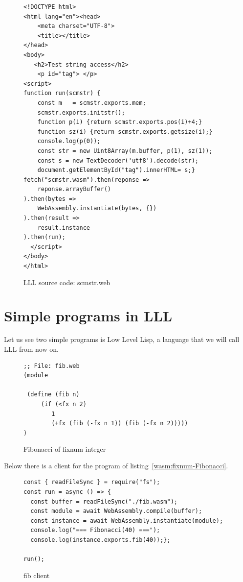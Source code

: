 \documentclass[a4paper,12pt]{book}
\begin{document}
\begin{figure}[!h]
\begin{verbatim}
<!DOCTYPE html>
<html lang="en"><head>
    <meta charset="UTF-8">
    <title></title>
</head>
<body>
   <h2>Test string access</h2>
    <p id="tag"> </p>
<script>
function run(scmstr) {
    const m   = scmstr.exports.mem;
    scmstr.exports.initstr();
    function p(i) {return scmstr.exports.pos(i)+4;}
    function sz(i) {return scmstr.exports.getsize(i);}
    console.log(p(0));
    const str = new Uint8Array(m.buffer, p(1), sz(1));
    const s = new TextDecoder('utf8').decode(str);
    document.getElementById("tag").innerHTML= s;}
fetch("scmstr.wasm").then(reponse =>
    reponse.arrayBuffer()
).then(bytes =>
    WebAssembly.instantiate(bytes, {})
).then(result =>
    result.instance
).then(run);
  </script>
</body>
</html>
\end{verbatim}
\caption{LLL source code: scmstr.web}
\label{wasm:scmstr.html}  
\end{figure}


\chapter{Simple programs in LLL}

Let us see two simple programs is Low Level Lisp,
a language that we will call LLL from now on.

\begin{figure}[!h]
\begin{verbatim}
;; File: fib.web
(module

 (define (fib n)
     (if (<fx n 2)
        1
        (+fx (fib (-fx n 1)) (fib (-fx n 2)))))
)
\end{verbatim}
  \caption{Fibonacci of fixnum integer}
  \label{wasm:fixnum-fibonacci}
\end{figure}

Below there is a client for the program of
listing~\ref{wasm:fixnum-Fibonacci}.

\begin{figure}[!h]
\begin{verbatim}
const { readFileSync } = require("fs");
const run = async () => {
  const buffer = readFileSync("./fib.wasm");
  const module = await WebAssembly.compile(buffer);
  const instance = await WebAssembly.instantiate(module);
  console.log("=== Fibonacci(40) ===");
  console.log(instance.exports.fib(40));};

run();
\end{verbatim}
  \caption{fib client}
  \label{wasm:fibclient}
\end{figure}
\end{document}
